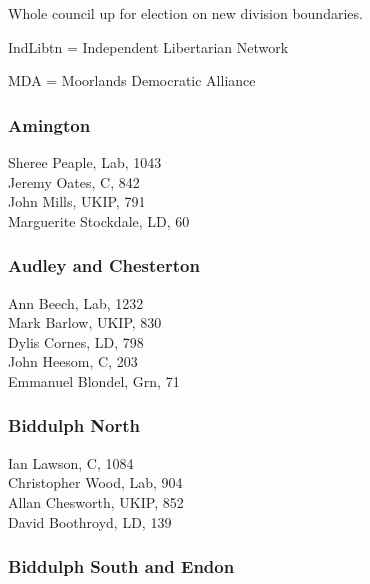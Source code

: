 \documentclass[a4paper,openany,10pt]{book}
\begin{document}
Whole council up for election on new division boundaries.

IndLibtn = Independent Libertarian Network

MDA = Moorlands Democratic Alliance



\subsubsection*{Amington}



Sheree Peaple, Lab, 1043\\
Jeremy Oates, C, 842\\
John Mills, UKIP, 791\\
Marguerite Stockdale, LD, 60\\


\subsubsection*{Audley and Chesterton}



Ann Beech, Lab, 1232\\
Mark Barlow, UKIP, 830\\
Dylis Cornes, LD, 798\\
John Heesom, C, 203\\
Emmanuel Blondel, Grn, 71\\


\subsubsection*{Biddulph North}



Ian Lawson, C, 1084\\
Christopher Wood, Lab, 904\\
Allan Chesworth, UKIP, 852\\
David Boothroyd, LD, 139\\


\subsubsection*{Biddulph South and Endon}

\end{document}
